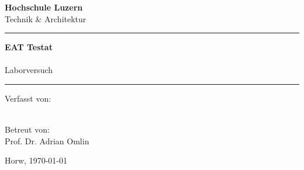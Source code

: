 \begin{titlepage}
    \begin{center}
        \textbf{\huge{Hochschule Luzern}}\\
        \vspace{2mm}
        \large{Technik \& Architektur}\\
        \vspace{5mm}
    \end{center}

    \vspace{0mm}

    \begin{center}
    \end{center} 

    \vspace{2mm}

    \begin{center}
        \rule{\textwidth}{2pt}
    \end{center}

    \begin{center}
      \textbf{\huge{EAT Testat}}\\
        \vspace{2mm}
        \Large{\makeatletter \@title  \makeatother}\\
        \vspace{2mm}
        \large{Laborversuch}
    \end{center}

    \begin{center}
        \rule{\textwidth}{2pt}
    \end{center}


    \begin{minipage}{0.7\textwidth}
    	\vspace{0pt}
        \begin{flushleft}
            Verfasst von:\\
            \large{\makeatletter \@author \makeatother}\\
            \vspace{4mm}
        \end{flushleft}
    \end{minipage}
    \begin{minipage}{0.3\textwidth}
    \vspace{0pt}
        \begin{flushright}
            Betreut von:\\
            \large{Prof. Dr. Adrian Omlin}
            \vspace{1mm}
        \end{flushright}
    \end{minipage}

	\vspace*{\fill}
    \begin{center}
        Horw, \today
    \end{center}

\end{titlepage}
\clearpage